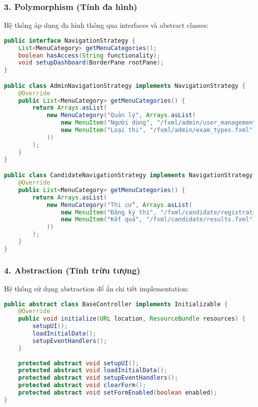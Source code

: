 \documentclass[12pt,a4paper]{article}
\begin{document}
\subsubsection{3. Polymorphism (Tính đa hình)}

Hệ thống áp dụng đa hình thông qua interfaces và abstract classes:

\begin{lstlisting}[language=Java, caption=Ví dụ về Polymorphism với NavigationStrategy]
public interface NavigationStrategy {
    List<MenuCategory> getMenuCategories();
    boolean hasAccess(String functionality);
    void setupDashboard(BorderPane rootPane);
}

public class AdminNavigationStrategy implements NavigationStrategy {
    @Override
    public List<MenuCategory> getMenuCategories() {
        return Arrays.asList(
            new MenuCategory("Quản lý", Arrays.asList(
                new MenuItem("Người dùng", "/fxml/admin/user_management.fxml"),
                new MenuItem("Loại thi", "/fxml/admin/exam_types.fxml")
            ))
        );
    }
}

public class CandidateNavigationStrategy implements NavigationStrategy {
    @Override
    public List<MenuCategory> getMenuCategories() {
        return Arrays.asList(
            new MenuCategory("Thi cử", Arrays.asList(
                new MenuItem("Đăng ký thi", "/fxml/candidate/registration.fxml"),
                new MenuItem("Kết quả", "/fxml/candidate/results.fxml")
            ))
        );
    }
}
\end{lstlisting}

\subsubsection{4. Abstraction (Tính trừu tượng)}

Hệ thống sử dụng abstraction để ẩn chi tiết implementation:

\begin{lstlisting}[language=Java, caption=Ví dụ về Abstraction với BaseController]
public abstract class BaseController implements Initializable {
    @Override
    public void initialize(URL location, ResourceBundle resources) {
        setupUI();
        loadInitialData();
        setupEventHandlers();
    }
    
    protected abstract void setupUI();
    protected abstract void loadInitialData();
    protected abstract void setupEventHandlers();
    protected abstract void clearForm();
    protected abstract void setFormEnabled(boolean enabled);
}
\end{lstlisting}
\end{document}

